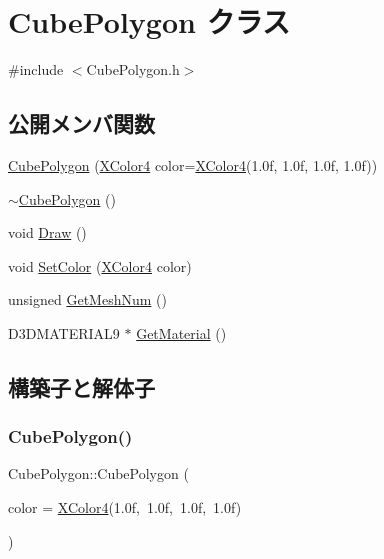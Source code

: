 \hypertarget{class_cube_polygon}{}\section{Cube\+Polygon クラス}
\label{class_cube_polygon}


{\ttfamily \#include $<$Cube\+Polygon.\+h$>$}

\subsection*{公開メンバ関数}
\begin{DoxyCompactItemize}
\item 
\mbox{\hyperlink{class_cube_polygon_aee418cf078227778280dafb22d7586bb}{Cube\+Polygon}} (\mbox{\hyperlink{_vector3_d_8h_a680c30c4a07d86fe763c7e01169cd6cc}{X\+Color4}} color=\mbox{\hyperlink{_vector3_d_8h_a680c30c4a07d86fe763c7e01169cd6cc}{X\+Color4}}(1.\+0f, 1.\+0f, 1.\+0f, 1.\+0f))
\item 
\mbox{\hyperlink{class_cube_polygon_ae6cd078c65ba32e8da56b8f7d5e92d2a}{$\sim$\+Cube\+Polygon}} ()
\item 
void \mbox{\hyperlink{class_cube_polygon_ac9003cd00eea402f2b6c5fb5a77feae2}{Draw}} ()
\item 
void \mbox{\hyperlink{class_cube_polygon_acf6a30c30c22dd887ed570db6cbe285d}{Set\+Color}} (\mbox{\hyperlink{_vector3_d_8h_a680c30c4a07d86fe763c7e01169cd6cc}{X\+Color4}} color)
\item 
unsigned \mbox{\hyperlink{class_cube_polygon_adf0956096c0d5dd31cf5b730dc8ca9c4}{Get\+Mesh\+Num}} ()
\item 
D3\+D\+M\+A\+T\+E\+R\+I\+A\+L9 $\ast$ \mbox{\hyperlink{class_cube_polygon_a6bd49d47a58c9c89a1ddaee37f7f4d22}{Get\+Material}} ()
\end{DoxyCompactItemize}


\subsection{構築子と解体子}
\mbox{\label{class_cube_polygon_aee418cf078227778280dafb22d7586bb}} 
\subsubsection{\texorpdfstring{Cube\+Polygon()}{CubePolygon()}}
{\footnotesize\ttfamily Cube\+Polygon\+::\+Cube\+Polygon (\begin{DoxyParamCaption}\item[{\mbox{\hyperlink{_vector3_d_8h_a680c30c4a07d86fe763c7e01169cd6cc}{X\+Color4}}}]{color = {\ttfamily \mbox{\hyperlink{_vector3_d_8h_a680c30c4a07d86fe763c7e01169cd6cc}{X\+Color4}}(1.0f,~1.0f,~1.0f,~1.0f)} }\end{DoxyParamCaption})}

